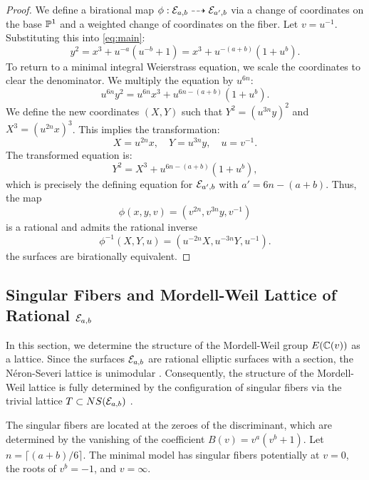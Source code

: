 \documentclass[11pt]{amsart}
\begin{document}
\begin{proof}
	We define a birational map $\phi: {\mathcal E}_{a,b} \dashrightarrow {\mathcal E}_{a', b}$ via a change of coordinates on the base ${\mathbb P}^1$ and a weighted change of coordinates on the fiber.
	Let $v = u^{-1}$. Substituting this into \eqref{eq:main}:
	\[
	y^2 = x^3 + u^{-a}(u^{-b}+1) = x^3 + u^{-(a+b)}(1+u^b).
	\]
	To return to a minimal integral Weierstrass equation, we scale the coordinates to clear the denominator. We multiply the equation by $u^{6n}$:
	\[
	u^{6n} y^2 = u^{6n} x^3 + u^{6n - (a+b)}(1+u^b).
	\]
	We define the new coordinates $(X, Y)$ such that $Y^2 = (u^{3n} y)^2$ and $X^3 = (u^{2n} x)^3$. This implies the transformation:
	\[
	X = u^{2n} x, \quad Y = u^{3n} y, \quad u = v^{-1}.
	\]
	The transformed equation is:
	\[
	Y^2 = X^3 + u^{6n - (a+b)}(1+u^b),
	\]
	which is precisely the defining equation for ${\mathcal E}_{a', b}$ with $a' = 6n - (a+b)$. Thus, the map 
	 $$\phi(x, y, v) = (v^{2n} , v^{3n} y, v^{-1})$$ is a 
	 rational and admits the rational inverse
	  $$\phi^{-1}(X, Y, u) = (u^{-2n}X, u^{-3n}Y, u^{-1}).$$
	  the surfaces are birationally equivalent.
\end{proof}


\subsection{Singular Fibers and Mordell-Weil Lattice of Rational ${\mathcal E}_{a,b}$}

In this section, we determine the structure of the Mordell-Weil group $E({\mathbb C}(v))$ as a lattice. Since the surfaces ${\mathcal E}_{a,b}$ are rational elliptic surfaces with a section, the Néron-Severi lattice is unimodular \cite[Prop. 7.1]{Schuett2019}. Consequently, the structure of the Mordell-Weil lattice is fully determined by the configuration of singular fibers via the trivial lattice $T \subset NS({\mathcal E}_{a,b})$ \cite[Thm. 8.6]{Schuett2019}.

The singular fibers are located at the zeroes of the discriminant, which are determined by the vanishing of the coefficient $B(v) = v^a(v^b+1)$. Let $n = \lceil (a+b)/6 \rceil$. The minimal model has singular fibers potentially at $v=0$, the roots of $v^b=-1$, and $v=\infty$.
\end{document}
